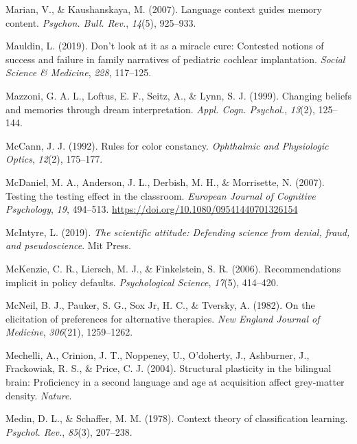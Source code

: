 \documentclass[
]{krantz}
\newlength{\cslhangindent}
\newenvironment{CSLReferences}[2] %
 {\begin{list}{}{%
  \setlength{\itemindent}{0pt}
  \setlength{\leftmargin}{0pt}
  \setlength{\parsep}{0pt}
  \ifodd #1
   \setlength{\leftmargin}{\cslhangindent}
   \setlength{\itemindent}{-1\cslhangindent}
  \fi
  \setlength{\itemsep}{#2\baselineskip}}}
 {\end{list}}
\begin{document}
\begin{CSLReferences}{1}{0}
Marian, V., \& Kaushanskaya, M. (2007). Language context guides memory content. \emph{Psychon. Bull. Rev.}, \emph{14}(5), 925--933.

Mauldin, L. (2019). Don't look at it as a miracle cure: Contested notions of success and failure in family narratives of pediatric cochlear implantation. \emph{Social Science \& Medicine}, \emph{228}, 117--125.

Mazzoni, G. A. L., Loftus, E. F., Seitz, A., \& Lynn, S. J. (1999). Changing beliefs and memories through dream interpretation. \emph{Appl. Cogn. Psychol.}, \emph{13}(2), 125--144.

McCann, J. J. (1992). Rules for color constancy. \emph{Ophthalmic and Physiologic Optics}, \emph{12}(2), 175--177.

McDaniel, M. A., Anderson, J. L., Derbish, M. H., \& Morrisette, N. (2007). Testing the testing effect in the classroom. \emph{European Journal of Cognitive Psychology}, \emph{19}, 494--513. \url{https://doi.org/10.1080/09541440701326154}

McIntyre, L. (2019). \emph{The scientific attitude: Defending science from denial, fraud, and pseudoscience}. Mit Press.

McKenzie, C. R., Liersch, M. J., \& Finkelstein, S. R. (2006). Recommendations implicit in policy defaults. \emph{Psychological Science}, \emph{17}(5), 414--420.

McNeil, B. J., Pauker, S. G., Sox Jr, H. C., \& Tversky, A. (1982). On the elicitation of preferences for alternative therapies. \emph{New England Journal of Medicine}, \emph{306}(21), 1259--1262.

Mechelli, A., Crinion, J. T., Noppeney, U., O'doherty, J., Ashburner, J., Frackowiak, R. S., \& Price, C. J. (2004). Structural plasticity in the bilingual brain: Proficiency in a second language and age at acquisition affect grey-matter density. \emph{Nature}.

Medin, D. L., \& Schaffer, M. M. (1978). Context theory of classification learning. \emph{Psychol. Rev.}, \emph{85}(3), 207--238.


\end{CSLReferences}
\end{document}
